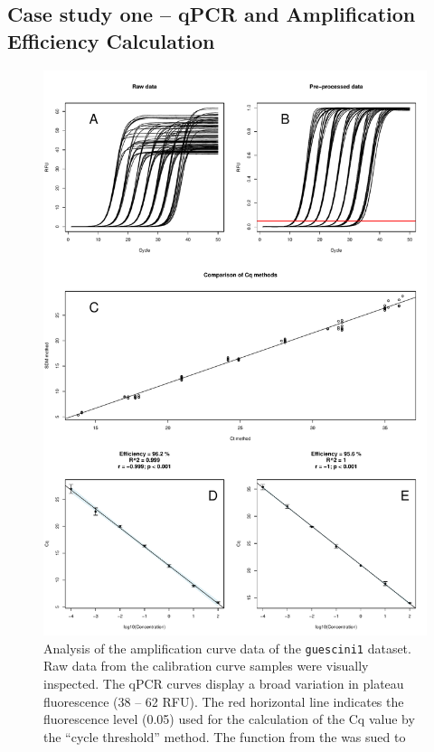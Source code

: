 \subsection{Case study one -- qPCR and Amplification Efficiency Calculation}

\begin{figure}[htbp]
  \centering
  \includegraphics[clip=true, width=14cm]{figures/dilution_Cq.pdf}
  \caption{Analysis of the amplification curve data of the \texttt{guescini1} 
dataset.  Raw data from the calibration curve samples were visually 
inspected. The qPCR curves display a broad variation in plateau fluorescence (38 
-- 62 RFU). The red horizontal line indicates the fluorescence level (0.05) used 
for the calculation of the Cq value by the ``cycle threshold'' method. 
 The  function from the  was sued to 
}
\end{figure}
